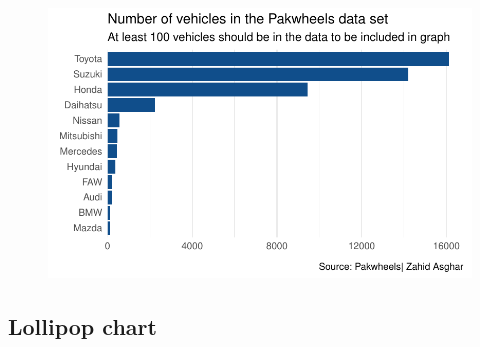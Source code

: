 \documentclass[
  letterpaper,
  DIV=11,
  numbers=noendperiod]{scrartcl}
\begin{document}
\begin{figure}[H]

{\centering \includegraphics[width=17.1875in,height=\textheight]{pakwheels_files/figure-pdf/unnamed-chunk-36-1.pdf}

}

\end{figure}

\hypertarget{lollipop-chart}{%
\subsection{Lollipop chart}\label{lollipop-chart}}
\end{document}
